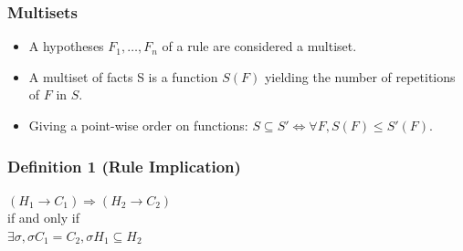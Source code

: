 \documentclass[10pt]{beamer}
\begin{document}
\begin{frame}
  \frametitle{Multisets}

  \begin{itemize}
    \item A hypotheses $F_1, \dots, F_n$ of a rule are considered a multiset.
    \item A multiset of facts S is a function $S(F)$ yielding the number of repetitions of $F$ in $S$.
    \item Giving a point-wise order on functions: $S \subseteq S' \Leftrightarrow \forall F, S(F) \leq S'(F)$.
  \end{itemize}
\end{frame}

\begin{frame}
  \frametitle{Definition 1 (Rule Implication)}
  \centering

  $(H_1 \rightarrow C_1) \Rightarrow (H_2 \rightarrow C_2)$\\
  if and only if\\
  $\exists \sigma, \sigma C_1 = C_2, \sigma H_1 \subseteq H_2$
\end{frame}
\end{document}
